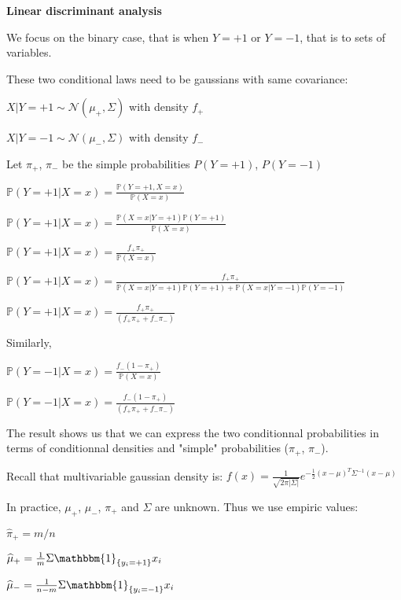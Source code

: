 {\fontsize{12pt}{22pt} \textbf{Linear discriminant analysis}\par}

\vspace{5mm}

We focus on the binary case, that is when $Y=+1$ or $Y=-1$, that is to sets of variables.

These two conditional laws need to be gaussians with same covariance: \vspace{1mm}

$X | Y=+1 \sim \mathcal{N}(\mu_+,\Sigma)$ with density $f_+$

$X | Y=-1 \sim \mathcal{N}(\mu_-,\Sigma)$ with density $f_-$

Let $\pi_+$, $\pi_-$ be the simple probabilities $P(Y=+1)$, $P(Y=-1)$\vspace{3mm}

$ \mathbb{P}(Y=+1|X=x) = \frac{\mathbb{P}(Y=+1, X=x)}{\mathbb{P}(X=x)}$

$ \mathbb{P}(Y=+1|X=x) = \frac{\mathbb{P}(X=x|Y=+1) \mathbb{P}(Y=+1) }{\mathbb{P}(X=x) }$

$ \mathbb{P}(Y=+1|X=x) = \frac{f_+ \pi_+}{\mathbb{P}(X=x) }$

$ \mathbb{P}(Y=+1|X=x) = \frac{f_+ \pi_+}{\mathbb{P}(X=x|Y=+1)\mathbb{P}(Y= +1) + \mathbb{P}(X=x|Y=-1)\mathbb{P}(Y= -1) }$

$\mathbb{P}(Y=+1|X=x) = \frac{f_+ \pi_+}{(f_+\pi_+ + f_-\pi_-)}$

Similarly,

$ \mathbb{P}(Y=-1|X=x) = \frac{f_- (1-\pi_+)}{\mathbb{P}(X=x) }$

$\mathbb{P}(Y=-1|X=x) = \frac{f_- (1-\pi_+)}{(f_+\pi_+ + f_-\pi_-)}$

\vspace{3mm}

The result shows us that we can express the two conditionnal probabilities in terms of conditionnal densities and "simple" probabilities ($\pi_+$, $\pi_-$).

Recall that multivariable gaussian density is: $f(x)=\frac{1}{\sqrt{2 \pi |\Sigma|}}e^{-\frac{1}{2}(x-\mu)^T\Sigma^{-1}(x-\mu)}$

In practice, $\mu_+$, $\mu_-$, $\pi_+$ and $\Sigma$ are unknown. Thus we use empiric values:

$\widehat{\pi}_+ = m/n$

$\widehat{\mu}_+ = \frac{1}{m} \Sigma \mathbbm{1}_{\{y_i=+1\}}x_i$

$\widehat{\mu}_- = \frac{1}{n-m} \Sigma \mathbbm{1}_{\{y_i=-1\}}x_i$

